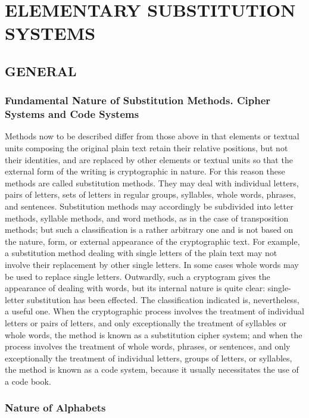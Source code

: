 \chapter{ELEMENTARY SUBSTITUTION SYSTEMS}

\section{GENERAL}

\subsection{Fundamental Nature of Substitution Methods. Cipher Systems and Code Systems}

Methods now to be described differ from those above in that elements
or textual units composing the original plain text retain their relative
positions, but not their identities, and are replaced by other elements or
textual units so that the external form of the writing is cryptographic in
nature. For this reason these methods are called substitution methods.
They may deal with individual letters, pairs of letters, sets of letters in
regular groups, syllables, whole words, phrases, and sentences. Substitution methods may accordingly be subdivided into letter methods, syllable
methods, and word methods, as in the case of transposition methods;
but such a classiﬁcation is a rather arbitrary one and is not based on the
nature, form, or external appearance of the cryptographic text. For
example, a substitution method dealing with single letters of the plain text
may not involve their replacement by other single letters. In some cases
whole words may be used to replace single letters. Outwardly, such a
cryptogram gives the appearance of dealing with words, but its internal
nature is quite clear: single-letter substitution has been effected. The
classiﬁcation indicated is, nevertheless, a useful one. When the cryptographic process involves the treatment of individual letters or pairs of
letters, and only exceptionally the treatment of syllables or whole words,
the method is known as a substitution cipher system; and when the
process involves the treatment of whole words, phrases, or sentences, and
only exceptionally the treatment of individual letters, groups of letters,
or syllables, the method is known as a code system, because it usually
necessitates the use of a code book.

\subsection{Nature of Alphabets}

